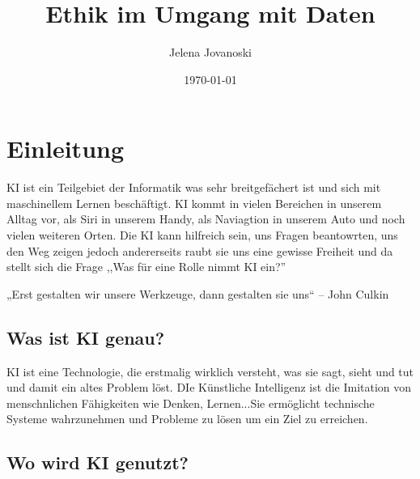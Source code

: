 \documentclass{report}
\title{Ethik im Umgang mit Daten}
\author{Jelena Jovanoski}
\date{\today}
\begin{document}
\maketitle



\tableofcontents

\chapter{Einleitung}

KI ist ein Teilgebiet der Informatik was sehr breitgefächert ist und sich mit maschinellem Lernen beschäftigt.
KI kommt in vielen Bereichen in unserem Alltag vor, als Siri in unserem Handy, als Naviagtion in unserem Auto und noch vielen weiteren Orten. 
Die KI kann hilfreich sein, uns Fragen beantowrten, uns den Weg zeigen jedoch andererseits raubt sie uns eine gewisse Freiheit und da stellt sich die Frage ,,Was für eine Rolle nimmt KI ein?''

„Erst gestalten wir unsere Werkzeuge, dann gestalten sie uns“ – John Culkin

\section {Was ist KI genau?}
KI ist eine Technologie, die erstmalig wirklich versteht, was sie sagt, sieht und tut und damit ein altes Problem löst.
DIe Künstliche Intelligenz ist die Imitation von menschnlichen Fähigkeiten wie Denken, Lernen...Sie ermöglicht technische Systeme wahrzunehmen und Probleme zu lösen um ein Ziel zu erreichen.

\section {Wo wird KI genutzt?}
\end{document}
